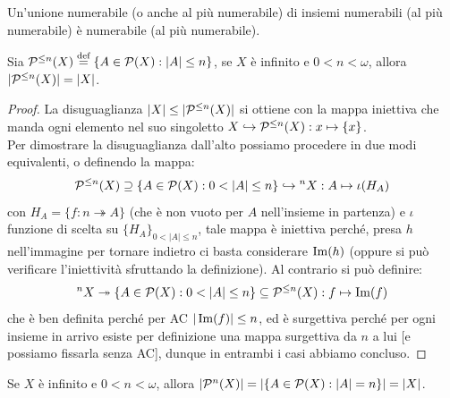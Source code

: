 \begin{corollary}
	Un'unione numerabile (o anche al più numerabile) di insiemi numerabili (al più numerabile) è numerabile (al più numerabile).
\end{corollary}

\begin{remark}
	Sia $\mathcal{P}^{\leq n}(X) \overset{\text{def}}{=} \{A \in \mathcal{P}(X) : |A| \leq n\}$, se $X$ è infinito e $0 < n < \omega$, allora $|\mathcal{P}^{\leq n}(X)| = |X|$.
\end{remark}

\begin{proof}
	La disuguaglianza $|X| \leq |\mathcal{P}^{\leq n}(X)|$ si ottiene con la mappa iniettiva che manda ogni elemento nel suo singoletto $X \hookrightarrow \mathcal{P}^{\leq n}(X) : x \mapsto \{x\}$.\\
	Per dimostrare la disuguaglianza dall'alto possiamo procedere in due modi equivalenti, o definendo la mappa:
	\[ \mathcal{P}^{\leq n}(X) \supseteq \{A \in \mathcal{P}(X) : 0 < |A| \leq n\} \hookrightarrow {}^n X : A \mapsto \iota(H_A)
		\]
	con $H_A = \{f : n \twoheadrightarrow A\}$ (che è non vuoto per $A$ nell'insieme in partenza) e $\iota$ funzione di scelta su $\{H_A\}_{0 < |A| \leq n}$, tale mappa è iniettiva perché, presa $h$ nell'immagine per tornare indietro ci basta considerare $\operatorname{Im}(h)$ (oppure si 
	può verificare l'iniettività sfruttando la definizione). Al contrario si può definire:
	\[ {}^n X \twoheadrightarrow \{A \in \mathcal{P}(X) : 0 < |A| \leq n\} \subseteq \mathcal{P}^{\leq n}(X) : f \mapsto \operatorname{Im}(f)
		\]
	che è ben definita perché per AC $|\operatorname{Im}(f)| \leq n$, ed è surgettiva perché per ogni insieme in arrivo esiste per definizione una mappa surgettiva da $n$ a lui [e possiamo fissarla senza AC], dunque in entrambi i casi abbiamo concluso.
\end{proof}

\begin{exercise}[$|\ps^{n}(X)| = |X|$]
	Se $X$ è infinito e $0<n<\omega$, allora $|\mathcal{P}^n(X)| = |\{A \in \mathcal{P}(X) : |A| = n\}| = |X|$.
\end{exercise}


